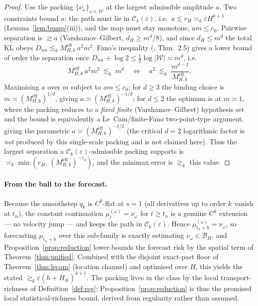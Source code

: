 \documentclass[11pt]{article}
\theoremstyle{definition}
\theoremstyle{remark}
\newcommand{\Ck}{\mathcal{C}_k(\varepsilon)}
\begin{document}
\begin{proof}
Use the packing $\{\nu_\omega\}_{\omega\in\mathcal W}$ at the largest admissible amplitude $a$. Two
constraints bound $a$: the path must lie in $\Ck$, i.e.\ $a\lesssim r_H\asymp_k\varepsilon H^{k+1}$
(Lemma~\ref{lem:bump}(iii)), and the map must stay monotone, $am\le c_0$. Pairwise separation is
$\gtrsim a$ (Varshamov--Gilbert, $d_H\ge m^d/8$), and since $d_H\le m^d$ the total KL obeys
$D_{\mathrm{tot}}\lesssim_k M^{\mathrm{eff}}_{H,k}\,a^2m^2$. Fano's inequality (\cite{tsybakov}, Thm.~2.5)
gives a lower bound of order the separation once
$D_{\mathrm{tot}}+\log2\le\tfrac12\log|\mathcal W|\asymp m^d$, i.e.
\[
  M^{\mathrm{eff}}_{H,k}\,a^2m^2\ \lesssim_k\ m^d
  \quad\Longleftrightarrow\quad
  a^2\ \lesssim_k\ \frac{m^{d-2}}{M^{\mathrm{eff}}_{H,k}}.
\]
Maximising $a$ over $m$ subject to $am\le c_0$: for $d\ge3$ the binding choice is
$m\asymp(M^{\mathrm{eff}}_{H,k})^{1/d}$, giving $a\asymp(M^{\mathrm{eff}}_{H,k})^{-1/d}$; for $d\le2$ the
optimum is at $m\asymp1$, where the packing reduces to a \emph{fixed finite} (Varshamov--Gilbert)
hypothesis set and the bound is equivalently a Le~Cam/finite-Fano two-point-type argument, giving the
parametric $a\asymp(M^{\mathrm{eff}}_{H,k})^{-1/2}$ (the critical $d=2$ logarithmic factor is \emph{not}
produced by this single-scale packing and is not claimed here). Thus the largest separation a
$\Ck$-admissible packing supports is $\asymp_k\min(r_H,\,(M^{\mathrm{eff}}_{H,k})^{-\gamma_d})$, and the
minimax error is $\gtrsim_k$ this value.
\end{proof}

\paragraph{From the ball to the forecast.} Because the smoothstep $q_k$ is $C^k$-flat at $s=1$ (all
derivatives up to order $k$ vanish at $t_n$), the constant continuation $\mu_t^{(\omega)}=\nu_\omega$
for $t\ge t_n$ is a genuine $C^k$ extension --- no velocity jump --- and keeps the path in $\Ck$.
Hence $\mu_{t_n+h}^{(\omega)}=\nu_\omega$, so forecasting $\mu_{t_n+h}$ over this sub-family is exactly
estimating $\nu_\omega\in\mathcal B_H$, and Proposition~\ref{prop:reduction} lower-bounds the forecast
risk by the spatial term of Theorem~\ref{thm:unified}. Combined with the disjoint exact-past floor of
Theorem~\ref{thm:lecam} (location channel) and optimised over $H$, this yields the stated
$\gtrsim_k\varepsilon(h+H_\#)^{k+1}$. The packing lives in the class by the local transport-richness of
Definition~\ref{def:reg}; Proposition~\ref{prop:reduction} is thus the promised local
statistical-richness bound, derived from regularity rather than assumed.
\end{document}
